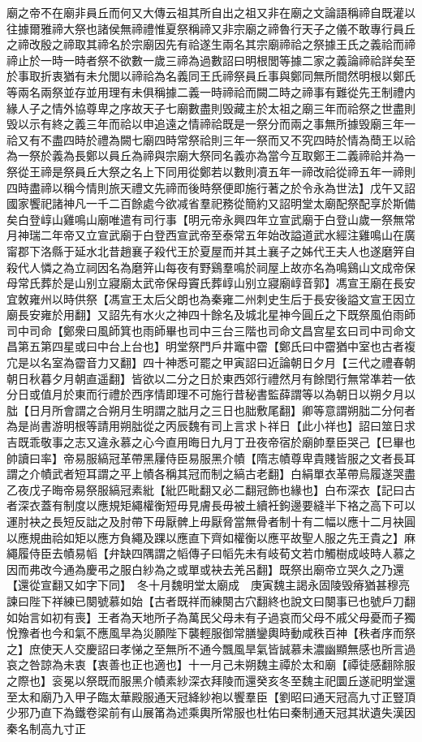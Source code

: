 廟之帝不在廟非員丘而何又大傳云祖其所自出之祖又非在廟之文論語稱禘自既灌以往據爾雅禘大祭也諸侯無禘禮惟夏祭稱禘又非宗廟之禘魯行天子之儀不敢專行員丘之禘改殷之禘取其禘名於宗廟因先有祫遂生兩名其宗廟禘祫之祭據王氏之義祫而禘禘止於一時一時者祭不欲數一歲三禘為過數詔曰明根閭等據二家之義論禘祫詳矣至於事取折衷猶有未允閭以禘祫為名義同王氏禘祭員丘事與鄭同無所間然明根以鄭氏等兩名兩祭並存並用理有未俱稱據二義一時禘祫而闕二時之禘事有難從先王制禮内緣人子之情外協尊卑之序故天子七廟數盡則毁藏主於太祖之廟三年而祫祭之世盡則毁以示有終之義三年而祫以申追遠之情禘祫既是一祭分而兩之事無所據毁廟三年一祫又有不盡四時於禮為闕七廟四時常祭祫則三年一祭而又不究四時於情為蕳王以祫為一祭於義為長鄭以員丘為禘與宗廟大祭同名義亦為當今互取鄭王二義禘祫并為一祭從王禘是祭員丘大祭之名上下同用從鄭若以數則凟五年一禘改祫從禘五年一禘則四時盡禘以稱今情則旅天禮文先禘而後時祭便即施行著之於令永為世法】戊午又詔國家饗祀諸神凡一千二百餘處今欲减省羣祀務從簡約又詔明堂太廟配祭配享於斯備矣白登崞山雞鳴山廟唯遣有司行事【明元帝永興四年立宣武廟于白登山歲一祭無常月神瑞二年帝又立宣武廟于白登西宣武帝至泰常五年始改謚道武水經注雞鳴山在廣甯郡下洛縣于延水北昔趙襄子殺代王於夏屋而并其土襄子之姊代王夫人也遂磨笄自殺代人憐之為立祠因名為磨笄山每夜有野鷄羣鳴於祠屋上故亦名為鳴鷄山文成帝保母常氏葬於是山别立寢廟太武帝保母竇氏葬崞山别立寢廟崞音郭】馮宣王廟在長安宜敇雍州以時供祭【馮宣王太后父朗也為秦雍二州刺史生后于長安後謚文宣王因立廟長安雍於用翻】又詔先有水火之神四十餘名及城北星神今圓丘之下既祭風伯雨師司中司命【鄭衆曰風師箕也雨師畢也司中三台三階也司命文昌宫星玄曰司中司命文昌第五第四星或曰中台上台也】明堂祭門戶井竈中霤【鄭氏曰中霤猶中室也古者複宂是以名室為霤音力又翻】四十神悉可罷之甲寅詔曰近論朝日夕月【三代之禮春朝朝日秋暮夕月朝直遥翻】皆欲以二分之日於東西郊行禮然月有餘閏行無常凖若一依分日或值月於東而行禮於西序情即理不可施行昔秘書監薛謂等以為朝日以朔夕月以朏【日月所會謂之合朔月生明謂之朏月之三日也胐敷尾翻】卿等意謂朔胐二分何者為是尚書游明根等請用朔朏從之丙辰魏有司上言求卜祥日【此小祥也】詔曰筮日求吉既乖敬事之志又違永慕之心今直用晦日九月丁丑夜帝宿於廟帥羣臣哭己【巳畢也帥讀曰率】帝易服縞冠革帶黑屨侍臣易服黑介幘【隋志幘尊卑貴賤皆服之文者長耳謂之介幘武者短耳謂之平上幘各稱其冠而制之縞古老翻】白絹單衣革帶烏履遂哭盡乙夜戊子晦帝易祭服縞冠素紕【紕匹毗翻又必二翻冠飾也緣也】白布深衣【記曰古者深衣蓋有制度以應規矩繩權衡短毋見膚長毋被土續衽鉤邊要縫半下袼之高下可以運肘袂之長短反詘之及肘帶下毋厭髀上毋厭脅當無骨者制十有二幅以應十二月袂圓以應規曲祫如矩以應方負繩及踝以應直下齊如權衡以應平故聖人服之先王貴之】麻繩履侍臣去幘易幍【弁缺四隅謂之幍傳子曰幍先未有岐荀文若巾觸樹成岐時人慕之因而弗改今通為慶弔之服白紗為之或單或袂去羌呂翻】既祭出廟帝立哭久之乃還【還從宣翻又如字下同】　冬十月魏明堂太廟成　庚寅魏主謁永固陵毁瘠猶甚穆亮諫曰陛下祥練已闋號慕如始【古者既祥而練闋古穴翻終也說文曰闋事已也號戶刀翻如始言如初有喪】王者為天地所子為萬民父母未有子過哀而父母不戚父母憂而子獨悅豫者也今和氣不應風旱為災願陛下襲輕服御常膳鑾輿時動咸秩百神【秩者序而祭之】庶使天人交慶詔曰孝悌之至無所不通今飄風旱氣皆誠慕未濃幽顯無感也所言過哀之咎諒為未衷【衷善也正也適也】十一月己未朔魏主禫於太和廟【禫徒感翻除服之際也】衮冕以祭既而服黑介幘素紗深衣拜陵而還癸亥冬至魏主祀圜丘遂祀明堂還至太和廟乃入甲子臨太華殿服通天冠絳紗袍以饗羣臣【劉昭曰通天冠高九寸正豎頂少邪乃直下為鐵卷梁前有山展筩為述乘輿所常服也杜佑曰秦制通天冠其狀遺失漢因秦名制高九寸正